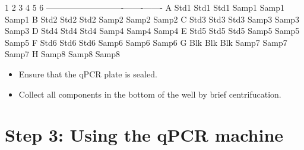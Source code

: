 \documentclass[
  letterpaper,
  DIV=11,
  numbers=noendperiod]{scrreprt}
\begin{document}
\textbar{} \textbar{} 1 \textbar{} 2 \textbar{} 3 \textbar{} 4
\textbar{} 5 \textbar{} 6 \textbar{}
\textbar---\textbar------\textbar------\textbar------\textbar-------\textbar-------\textbar-------\textbar{}
\textbar{} A \textbar{} Std1 \textbar{} Std1 \textbar{} Std1 \textbar{}
Samp1 \textbar{} Samp1 \textbar{} Samp1 \textbar{} \textbar{} B
\textbar{} Std2 \textbar{} Std2 \textbar{} Std2 \textbar{} Samp2
\textbar{} Samp2 \textbar{} Samp2 \textbar{} \textbar{} C \textbar{}
Std3 \textbar{} Std3 \textbar{} Std3 \textbar{} Samp3 \textbar{} Samp3
\textbar{} Samp3 \textbar{} \textbar{} D \textbar{} Std4 \textbar{} Std4
\textbar{} Std4 \textbar{} Samp4 \textbar{} Samp4 \textbar{} Samp4
\textbar{} \textbar{} E \textbar{} Std5 \textbar{} Std5 \textbar{} Std5
\textbar{} Samp5 \textbar{} Samp5 \textbar{} Samp5 \textbar{} \textbar{}
F \textbar{} Std6 \textbar{} Std6 \textbar{} Std6 \textbar{} Samp6
\textbar{} Samp6 \textbar{} Samp6 \textbar{} \textbar{} G \textbar{} Blk
\textbar{} Blk \textbar{} Blk \textbar{} Samp7 \textbar{} Samp7
\textbar{} Samp7 \textbar{} \textbar{} H \textbar{} \textbar{}
\textbar{} \textbar{} Samp8 \textbar{} Samp8 \textbar{} Samp8 \textbar{}

\begin{itemize}
\item
  Ensure that the qPCR plate is sealed.
\item
  Collect all components in the bottom of the well by brief
  centrifucation.
\end{itemize}

\hypertarget{step-3-using-the-qpcr-machine}{%
\section*{\texorpdfstring{\textbf{Step 3: Using the qPCR
machine}}{Step 3: Using the qPCR machine}}\label{step-3-using-the-qpcr-machine}}

\end{document}
